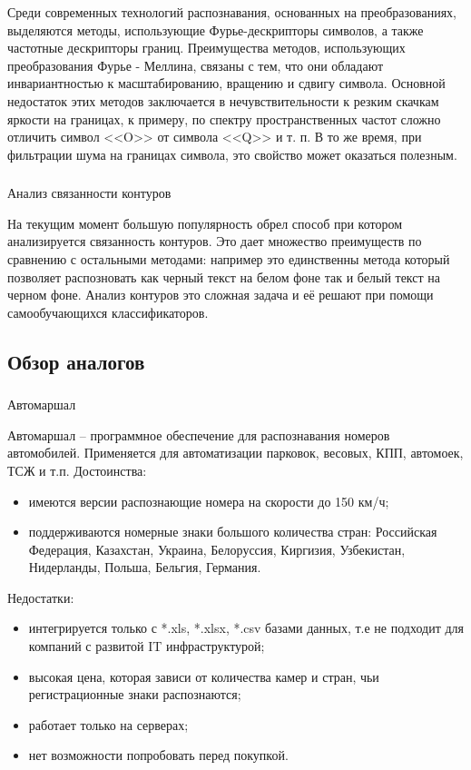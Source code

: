 Среди современных технологий распознавания, основанных на преобразованиях, выделяются методы, использующие Фурье-дескрипторы символов, а также частотные дескрипторы границ.
Преимущества методов, использующих преобразования Фурье - Меллина, связаны с тем, что они обладают инвариантностью к масштабированию, вращению и сдвигу символа. Основной недостаток этих методов заключается в нечувствительности к резким скачкам яркости на границах, к примеру, по спектру пространственных частот сложно отличить символ <<O>> от символа <<Q>> и т. п. В то же время, при фильтрации шума на границах символа, это свойство может оказаться полезным.

\subsubsection{}
\label{sub:domain:recognition:contour_anolisys}
Анализ связанности контуров

На текущим момент большую популярность обрел способ при котором анализируется связанность контуров. Это дает множество преимуществ по сравнению с остальными методами: например это единственны метода который позволяет распозновать как черный текст на белом фоне так и белый текст на черном фоне. Анализ контуров это сложная задача и её решают при помощи самообучающихся классификаторов.  


\subsection{Обзор аналогов}
\label{sub:domain:analogs}

\subsubsection{}
\label{sub:domain:realization:automarshal}
Автомаршал 

Автомаршал – программное обеспечение для распознавания номеров автомобилей. Применяется для автоматизации парковок, весовых, КПП, автомоек, ТСЖ и т.п.\cite{auto_marshal}
Достоинства:
\begin{itemize}
  \item имеются версии распознающие номера на скорости до 150 км/ч;
  \item поддерживаются номерные знаки большого количества стран: Российская Федерация, Казахстан, Украина, Белоруссия, Киргизия, Узбекистан, Нидерланды, Польша, Бельгия, Германия.
\end{itemize}
Недостатки:
\begin{itemize}
  \item интегрируется только с *.xls, *.xlsx, *.csv базами данных, т.е не подходит для компаний с развитой IT инфраструктурой;
  \item высокая цена, которая зависи от количества камер и стран, чьи регистрационные знаки распознаются;
  \item работает только на \windows{} серверах;
  \item нет возможности попробовать перед покупкой.
\end{itemize}

